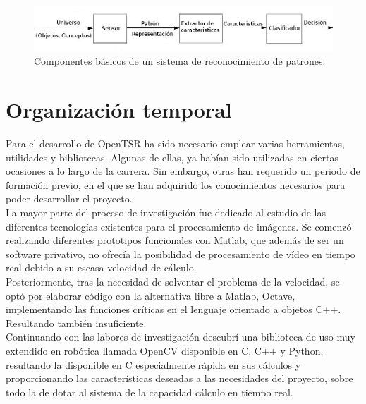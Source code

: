 \documentclass[a4paper,12pt]{article}
\begin{document}
\begin{figure}[H]
  \begin{center}
    \includegraphics[scale=0.6]{imagenes/Pattern.jpg}
  \end{center}
  \caption{Componentes básicos de un sistema de reconocimiento de patrones.}
  \label{Componentes-basicos-rp}
\end{figure}



\section{Organización temporal}


Para el desarrollo de OpenTSR ha sido necesario emplear varias herramientas, utilidades y bibliotecas. Algunas de ellas, ya habían sido utilizadas en ciertas ocasiones a lo largo de la carrera. Sin embargo, otras han requerido un periodo de formación previo, en el que se han adquirido los conocimientos necesarios para poder desarrollar el proyecto.\\

La mayor parte del proceso de investigación fue dedicado al estudio de las diferentes tecnologías existentes para el procesamiento de imágenes. Se comenzó realizando diferentes prototipos funcionales con Matlab, que además de ser un software privativo, no ofrecía la posibilidad de procesamiento de vídeo en tiempo real debido a su escasa velocidad de cálculo.\\

Posteriormente, tras la necesidad de solventar el problema de la velocidad, se optó por elaborar código con la alternativa libre a Matlab, Octave, implementando las funciones críticas en el lenguaje orientado a objetos C++. Resultando también insuficiente.\\

Continuando con las labores de investigación descubrí una biblioteca de uso muy extendido en robótica llamada OpenCV disponible en C, C++ y Python, resultando la disponible en C especialmente rápida en sus cálculos y proporcionando las características deseadas a las necesidades del proyecto, sobre todo la de dotar al sistema de la capacidad cálculo en tiempo real.\\
\end{document}
